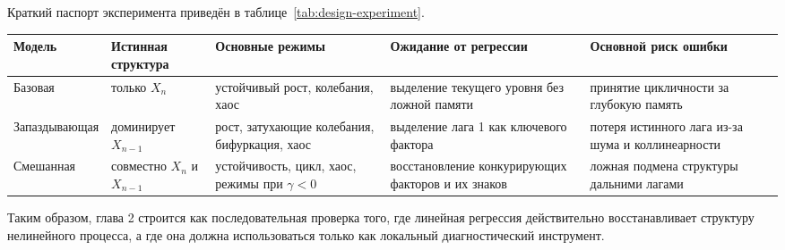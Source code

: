 Краткий паспорт эксперимента приведён в таблице~\ref{tab:design-experiment}.

\begin{center}
\label{tab:design-experiment}
\end{center}

{\def\LTcaptype{none} %
\begin{longtable}[]{@{}
  >{\raggedright\arraybackslash}p{}
  >{\raggedright\arraybackslash}p{}
  >{\raggedright\arraybackslash}p{}
  >{\raggedright\arraybackslash}p{}
  >{\raggedright\arraybackslash}p{}@{}}
\toprule\noalign{}
\begin{minipage}[b]{\linewidth}\raggedright
Модель
\end{minipage} & \begin{minipage}[b]{\linewidth}\raggedright
Истинная структура
\end{minipage} & \begin{minipage}[b]{\linewidth}\raggedright
Основные режимы
\end{minipage} & \begin{minipage}[b]{\linewidth}\raggedright
Ожидание от регрессии
\end{minipage} & \begin{minipage}[b]{\linewidth}\raggedright
Основной риск ошибки
\end{minipage} \\
\midrule\noalign{}
\endhead
\bottomrule\noalign{}
\endlastfoot
Базовая & только \(X_n\) & устойчивый рост, колебания, хаос & выделение текущего уровня без ложной памяти & принятие цикличности за глубокую память \\
Запаздывающая & доминирует \(X_{n-1}\) & рост, затухающие колебания, бифуркация, хаос & выделение лага 1 как ключевого фактора & потеря истинного лага из-за шума и коллинеарности \\
Смешанная & совместно \(X_n\) и \(X_{n-1}\) & устойчивость, цикл, хаос, режимы при \(\gamma<0\) & восстановление конкурирующих факторов и их знаков & ложная подмена структуры дальними лагами \\
\end{longtable}
}

Таким образом, глава 2 строится как последовательная проверка того, где линейная регрессия действительно восстанавливает структуру нелинейного процесса, а где она должна использоваться только как локальный диагностический инструмент.


